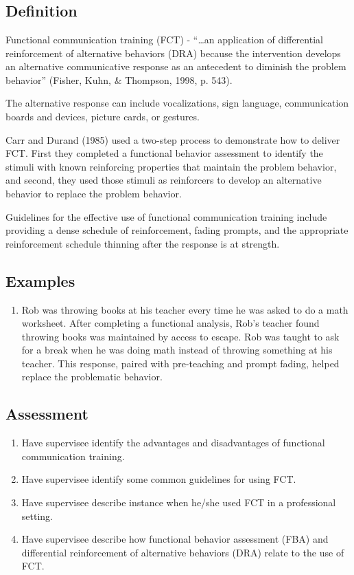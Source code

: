 \section{\fourfSeven{}}
\subsection{Definition}
Functional communication training (FCT) - ``…an application of differential reinforcement of alternative behaviors (DRA) because the intervention develops an alternative communicative response as an antecedent to diminish the problem behavior'' (Fisher, Kuhn, \& Thompson, 1998, p. 543).

The alternative response can include vocalizations, sign language, communication boards and devices, picture cards, or gestures.

Carr and Durand (1985) used a two-step process to demonstrate how to deliver FCT.  First they completed a functional behavior assessment to identify the stimuli with known reinforcing properties that maintain the problem behavior, and second, they used those stimuli as reinforcers to develop an alternative behavior to replace the problem behavior.

Guidelines for the effective use of functional communication training include providing a dense schedule of reinforcement, fading prompts, and the appropriate reinforcement schedule thinning after the response is at strength.
%
\subsection{Examples}
\begin{enumerate}
\item Rob was throwing books at his teacher every time he was asked to do a math worksheet. After completing a functional analysis, Rob's teacher found throwing books was maintained by access to escape. Rob was taught to ask for a break when he was doing math instead of throwing something at his teacher. This response, paired with pre-teaching and prompt fading, helped replace the problematic behavior.
\end{enumerate}
%
\subsection{Assessment}
\begin{enumerate}
\item Have supervisee identify the advantages and disadvantages of functional communication training.
\item Have supervisee identify some common guidelines for using FCT.
\item Have supervisee describe instance when he/she used FCT in a professional setting.
\item Have supervisee describe how functional behavior assessment (FBA) and differential reinforcement of alternative behaviors (DRA) relate to the use of FCT.
%
\end{enumerate}
%
